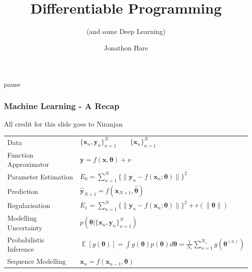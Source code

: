 \documentclass[\beamerclass]{beamer}
\title[DISCNet Machine Learning]{Differentiable Programming}
\subtitle{(and some Deep Learning)}
\author{Jonathon Hare}
\institute[]
{
  Vision, Learning and Control\\
  University of Southampton 
}
\date{}
\begin{document}
  \frame{
  \titlepage
}

\begin{frame}{pause}
\frametitle{Machine Learning - A Recap}
{\tiny All credit for this slide goes to Niranjan}\\
\vspace{5mm}
\begin{tabular}{ll}
Data & $\{\bm{x}_n, \bm{y}_n\}^N_{n=1} \qquad \{\bm{x}_n\}^N_{n=1}$ 
\vspace{3mm} \\ \pause
Function Approximator & $\bm{y} = f (\bm{x}, \bm{\theta}) + \nu$ 
\vspace{3mm} \\ \pause
Parameter Estimation & $E_0 = \sum^N_{n=1} \{\|\bm{y}_n - f (\bm{x}_n; \bm{\theta})\|\}^2$
\vspace{3mm} \\ \pause
Prediction & $\bm{\hat y}_{N+1} = f(\bm{x}_{N+1}, \bm{\hat \theta})$
\vspace{3mm} \\ \pause
Regularisation & $E_1 = \sum^N_{n=1} \{\|\bm{y}_n - f (\bm{x}_n; \bm{\theta})\|\}^2 + r(\|\bm\theta\|)$
\vspace{3mm} \\ \pause
Modelling Uncertainty & $p(\bm\theta|\{\bm x_n, \bm y_n\}_{n=1}^N)$
\vspace{3mm} \\ \pause
Probabilistic Inference & $\mathop{\mathbb{E}}[g(\bm\theta)] = \int g(\bm\theta)p(\bm\theta)d\bm\theta = \frac{1}{N_s}\sum_{n=1}^{N_s}g(\bm\theta^{(n)})$
\vspace{3mm} \\ \pause
Sequence Modelling & $\bm x_n = f(\bm x_{n-1}, \bm\theta)$
\end{tabular}
\vspace{5mm}
\end{frame}
\end{document}
